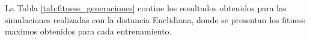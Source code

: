 \documentclass[lettersize, journal]{IEEEtran}
\begin{document}






La Tabla \ref{tab:fitness_generaciones} contine los resultados obtenidos para las simulaciones realizadas con la distancia Euclidiana, donde se presentan los fitness maximos obtenidos para cada entrenamiento.
\end{document}
